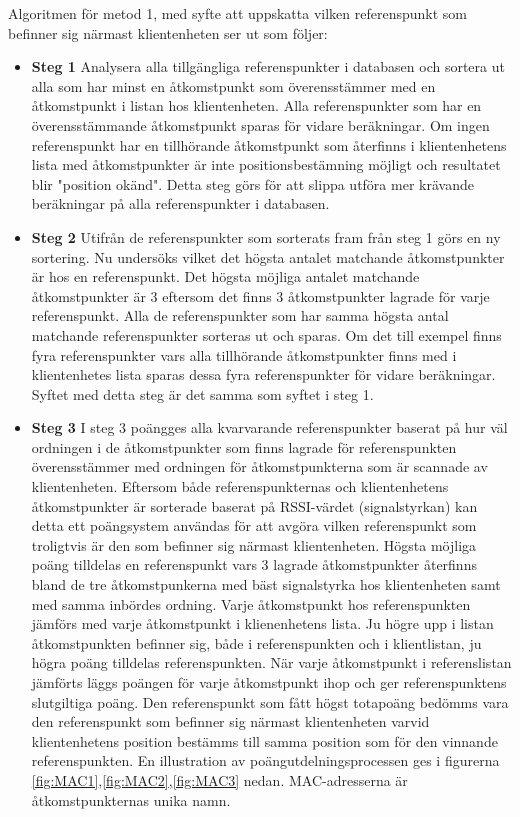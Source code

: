 \documentclass[swedish, a4paper,12pt]{article}
\begin{document}
Algoritmen för metod 1, med syfte att uppskatta vilken referenspunkt som befinner sig närmast klientenheten ser ut som följer:

  \begin{itemize}
    \item \textbf{Steg 1}
    \newline
    Analysera alla tillgängliga referenspunkter i databasen och sortera ut alla som har minst en åtkomstpunkt som överensstämmer med en åtkomstpunkt i listan hos klientenheten. Alla referenspunkter som har en överensstämmande åtkomstpunkt sparas för vidare beräkningar. Om ingen referenspunkt har en tillhörande åtkomstpunkt som återfinns i klientenhetens lista med åtkomstpunkter är inte positionsbestämning möjligt och resultatet blir "position okänd".
    Detta steg görs för att slippa utföra mer krävande beräkningar på alla referenspunkter i databasen.
    \item \textbf{Steg 2}
    \newline
    Utifrån de referenspunkter som sorterats fram från steg 1 görs en ny sortering. Nu undersöks vilket det högsta antalet matchande åtkomstpunkter är hos en referenspunkt. Det högsta möjliga antalet matchande åtkomstpunkter är 3 eftersom det finns 3 åtkomstpunkter lagrade för varje referenspunkt. Alla de referenspunkter som har samma högsta antal matchande referenspunkter sorteras ut och sparas.
    Om det till exempel finns fyra referenspunkter vars alla tillhörande åtkomstpunkter finns med i klientenhetes lista sparas dessa fyra referenspunkter för vidare beräkningar. Syftet med detta steg är det samma som syftet i steg 1.

    \item \textbf{Steg 3}
    \newline
    I steg 3 poängges alla kvarvarande referenspunkter baserat på hur väl ordningen i de åtkomstpunkter som finns lagrade för referenspunkten överensstämmer med ordningen för åtkomstpunkterna som är scannade av klientenheten. Eftersom både referenspunkternas och klientenhetens åtkomstpunkter är sorterade baserat på RSSI-värdet (signalstyrkan) kan detta ett poängsystem användas för att avgöra vilken referenspunkt som troligtvis är den som befinner sig närmast klientenheten.
    Högsta möjliga poäng tilldelas en referenspunkt vars 3 lagrade åtkomstpunkter återfinns bland de tre åtkomstpunkerna med bäst signalstyrka hos klientenheten samt med samma inbördes ordning. Varje åtkomstpunkt hos referenspunkten jämförs med varje åtkomstpunkt i klienenhetens lista. Ju högre upp i listan åtkomstpunkten befinner sig, både i referenspunkten och i klientlistan, ju högra poäng tilldelas referenspunkten. När varje åtkomstpunkt i referenslistan jämförts läggs poängen för varje åtkomstpunkt ihop och ger referenspunktens slutgiltiga poäng.
    Den referenspunkt som fått högst totapoäng bedömms vara den referenspunkt som befinner sig närmast klientenheten varvid klientenhetens position bestämms till samma position som för den vinnande referenspunkten.
    En illustration av poängutdelningsprocessen ges i figurerna \ref{fig:MAC1},\ref{fig:MAC2},\ref{fig:MAC3} nedan.
    MAC-adresserna är åtkomstpunkternas unika namn.


\end{itemize}
\end{document}
